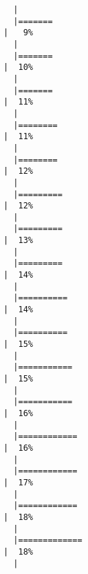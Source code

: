 \documentclass[12pt]{article}
\begin{document}
\begin{verbatim}
  |                                                                            
  |=======                                                               |   9%
  |                                                                            
  |=======                                                               |  10%
  |                                                                            
  |=======                                                               |  11%
  |                                                                            
  |========                                                              |  11%
  |                                                                            
  |========                                                              |  12%
  |                                                                            
  |=========                                                             |  12%
  |                                                                            
  |=========                                                             |  13%
  |                                                                            
  |=========                                                             |  14%
  |                                                                            
  |==========                                                            |  14%
  |                                                                            
  |==========                                                            |  15%
  |                                                                            
  |===========                                                           |  15%
  |                                                                            
  |===========                                                           |  16%
  |                                                                            
  |============                                                          |  16%
  |                                                                            
  |============                                                          |  17%
  |                                                                            
  |============                                                          |  18%
  |                                                                            
  |=============                                                         |  18%
  |                                                                            

\end{verbatim}
\end{document}
